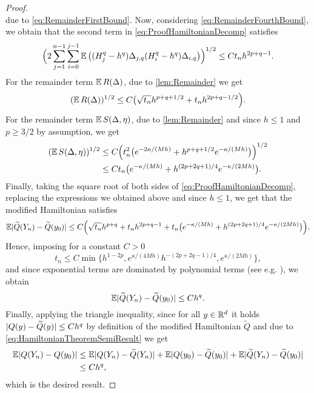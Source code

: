 \documentclass[10pt]{article}
\begin{document}
\begin{proof}
\begin{equation}
	\end{equation}
	due to \eqref{eq:RemainderFirstBound}. Now, considering {\eqref{eq:RemainderFourthBound}}, we obtain that the second term in \eqref{eq:ProofHamiltonianDecomp} satisfies
	\begin{equation}
		\Big(2\sum_{j=1}^{n-1}\sum_{i=0}^{j-1} \operatorname{\mathbb{E}}\big((H_j^q - h^q)\Delta_{j,q}(H_i^q - h^q) \Delta_{i,q}\big)\Big)^{1/2} \leq  C t_n h^{2p+q-1}.
	\end{equation}
	For the remainder term $\operatorname{\mathbb{E}} R(\Delta)$, due to \cref{lem:Remainder} we get
	\begin{equation}
		(\operatorname{\mathbb{E}} R(\Delta))^{1/2} \leq C \big(\sqrt{t_n} h^{p + q + 1/2} + t_n h^{2p + q - 1/2}\Big).
	\end{equation}
	For the remainder term $\operatorname{\mathbb{E}} S(\Delta, \eta)$, due to \cref{lem:Remainder} and since $h \leq 1$ and $p \geq 3/2$ by assumption, we get
	\begin{equation}\label{eq:BoundS}
	\begin{aligned}
		(\operatorname{\mathbb{E}} S(\Delta, \eta))^{1/2} &\leq C \Big( t_n^2 \big(e^{-2\kappa/(Mh)} + h^{p+q+1/2}e^{-\kappa/(Mh)}\big) \Big)^{1/2}\\
		&\leq C t_n \big(e^{-\kappa/(Mh)} + h^{(2p+2q+1)/4}e^{-\kappa/(2Mh)}\big).
	\end{aligned}
	\end{equation}
	Finally, taking the square root of both sides of \eqref{eq:ProofHamiltonianDecomp}, replacing the expressions we obtained above and since $h \leq 1$, we get that the modified Hamiltonian satisfies
	\begin{equation}
	\begin{aligned}
		\operatorname{\mathbb{E}} \lvert\widetilde Q(Y_n) - \widetilde Q(y_0)\rvert \leq C \Big(\sqrt{t_n} h^{p+q} + t_n h^{2p+q-1} + t_n \big(e^{-\kappa/(Mh)} + h^{(2p+2q+1)/4}e^{-\kappa/(2Mh)}\big)\Big).
	\end{aligned}
	\end{equation}
	Hence, imposing for a constant $C > 0$
	\begin{equation}
		t_n \leq C \min\{h^{1-2p}, e^{\kappa/(4Mh)} h^{-(2p+2q-1)/4}, e^{\kappa/(2Mh)}\},
	\end{equation}
	and since exponential terms are dominated by polynomial terms (see e.g. \cite[Theorem IX.8.1]{HLW06}), we obtain
	\begin{equation}\label{eq:HamiltonianTheoremSemiResult}
		\operatorname{\mathbb{E}} \lvert\widetilde Q(Y_n) - \widetilde Q(y_0)\rvert \leq Ch^q.
	\end{equation}
	Finally, applying the triangle inequality, since {for all $y \in \mathbb{R}^d$ it holds} $\lvert Q(y) - \widetilde Q(y)\rvert \leq Ch^q$ by definition of the modified Hamiltonian $\tilde Q$ {and due to \eqref{eq:HamiltonianTheoremSemiResult}} we get
	\begin{equation}
	\begin{aligned}
		\operatorname{\mathbb{E}}\lvert Q(Y_n) - Q(y_0)\rvert &\leq \operatorname{\mathbb{E}}\lvert Q(Y_n) - \widetilde Q(Y_n)\rvert + \operatorname{\mathbb{E}} \lvert Q(y_0) - \widetilde Q (y_0)\rvert + \operatorname{\mathbb{E}}\lvert\widetilde Q(Y_n) - \widetilde Q(y_0)\rvert \\
		&\leq C h^q,
	\end{aligned}
	\end{equation}
	which is the desired result.
\end{proof}
\end{document}
